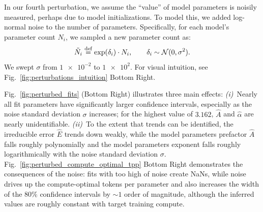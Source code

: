 In our fourth perturbation, we assume the ``value'' of model parameters is noisily measured, perhaps due to model initializations. To model this, we added log-normal noise to the number of parameters. Specifically, for each model's parameter count $N_i$, we sampled a new parameter count as:
%
\begin{equation}\label{eqn:log_normal_noise}
    \Tilde{N}_i \operatorname{\stackrel{\text{def}}{\;=\;}} \exp(\delta_i) \cdot N_i , \quad \quad  \delta_i \sim \mathcal{N}(0, \sigma^2).
\end{equation}
We swept $\sigma$ from $\num{1e-2}$ to $\num{1e2}$. For visual intuition, see Fig.~\ref{fig:perturbations_intuition} Bottom Right.

Fig.~\ref{fig:perturbed_fits} (Bottom Right) illustrates three main effects:
\emph{(i)}~Nearly all fit parameters have significantly larger confidence intervals, especially as the noise standard deviation $\sigma$ increases; for the highest value of $3.162$, $\hat{A}$ and $\hat{\alpha}$ are nearly unidentifiable.
\emph{(ii)}~To the extent that trends can be identified, the irreducible error $\hat{E}$ trends down weakly, while the model parameters prefactor $\hat{A}$ falls roughly polynomially and the model parameters exponent falls roughly logarithmically with the noise standard deviation $\sigma$.
Fig.~\ref{fig:perturbed_compute_optimal_tpp} Bottom Right demonstrates the consequences of the noise: fits with too high of noise create NaNs, while noise drives up the compute-optimal tokens per parameter and also increases the width of the 80\% confidence intervals by $\sim 1$ order of magnitude, although the inferred values are roughly constant with target training compute.